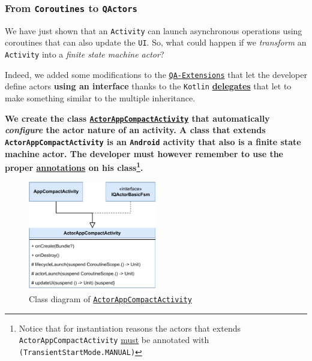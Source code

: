 \subsubsection{From \texttt{Coroutines} to \texttt{QActors}}

We have just shown that an \texttt{Activity} can launch asynchronous operations using coroutines that can also update the \texttt{UI}. So, what could happen if we \textit{transform} an \texttt{Activity} into a \textit{finite state machine actor}?

Indeed, we added some modifications to the \href{https://github.com/LM-96/QA-Extensions}{\texttt{QA-Extensions}} that let the developer define actors \textbf{using an interface} thanks to the \texttt{Kotlin} \href{https://kotlinlang.org/docs/delegated-properties.html}{\textbf{delegates}} that let to make something similar to the multiple inheritance.

\begin{tcolorbox}
	\begin{center}
		\textbf{We create the class \href{https://github.com/LucaLand/MobileSystemsProject-LL/blob/0.9.1/app/src/main/java/it/unibo/mobilesystems/actors/ActorAppCompactActivity.kt}{\texttt{ActorAppCompactActivity}} that automatically \textit{configure} the actor nature of an activity. A class that extends \texttt{ActorAppCompactActivity} is an \texttt{Android} activity that also is a finite state machine actor. The developer must however remember to use the proper \href{https://github.com/LM-96/QA-Extensions/tree/android/it.unibo.qakactor/src/main/kotlin/annotations}{annotations} on his class\footnote{Notice that for instantiation reasons the actors that extends \texttt{ActorAppCompactActivity} \underline{must} be annotated with \texttt{\@StartMode(TransientStartMode.MANUAL)}}.}
	\end{center}
\end{tcolorbox}

\begin{figure}[h!]
	\centering
	\includegraphics[width=0.5\textwidth]{img/actorappcompactactivity_uml.pdf}
	\caption{Class diagram of \href{https://github.com/LucaLand/MobileSystemsProject-LL/blob/0.9.1/app/src/main/java/it/unibo/mobilesystems/actors/ActorAppCompactActivity.kt}{\texttt{ActorAppCompactActivity}}}
	\label{fig:uml_actorappcompactactivity}
\end{figure}

